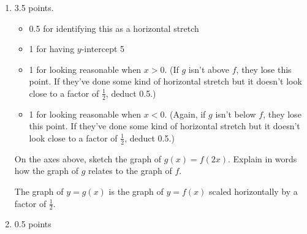 \documentclass{article}
\begin{document}
\begin{enumerate}
\begin{enumerate}
    \begin{solution}
      $b>1$. We know this because the function is increasing.
    \end{solution}

  \item
    \begin{grading}
      3.5 points. 
      \begin{itemize}[nosep]
      \item 0.5 for identifying this as a horizontal stretch
      \item 1 for having $y$-intercept 5
      \item 1 for looking reasonable when $x > 0$. (If $g$ isn't above $f$, they lose this point. If they've done some kind of horizontal stretch but it doesn't look close to a factor of $\frac{1}{2}$, deduct 0.5.)
      \item 1 for looking reasonable when $x < 0$. (Again, if $g$ isn't below $f$, they lose this point. If they've done some kind of horizontal stretch but it doesn't look close to a factor of $\frac{1}{2}$, deduct 0.5.) 
      \end{itemize}
    \end{grading}

    \begin{problem}[\stretch{0.75}]
      On the axes above, sketch the graph of $g(x) = f(2x)$. Explain in words how the graph of $g$ relates to the graph of $f$. 
    \end{problem}

    \begin{solution}
      The graph of $y=g(x)$ is the graph of $y=f(x)$ scaled horizontally by a factor
      of $\frac{1}{2}$.
      \begin{center}
      \end{center}
    \end{solution}

  \item

    \begin{grading}
      0.5 points
    \end{grading}


\end{enumerate}
\end{enumerate}
\end{document}
